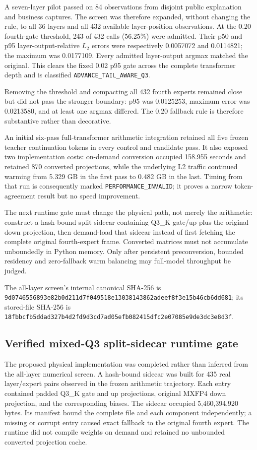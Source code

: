 A seven-layer pilot passed on 84 observations from disjoint public explanation
and business captures.  The screen was therefore expanded, without changing
the rule, to all 36 layers and all 432 available layer-position observations.
At the 0.20 fourth-gate threshold, 243 of 432 calls (56.25\%) were admitted.
Their p50 and p95 layer-output-relative $L_2$ errors were respectively
0.0057072 and 0.0114821; the maximum was 0.0177109.  Every admitted layer-output
argmax matched the original.  This clears the fixed 0.02 p95 gate across the
complete transformer depth and is classified
\texttt{ADVANCE\_TAIL\_AWARE\_Q3}.

Removing the threshold and compacting all 432 fourth experts remained close
but did not pass the stronger boundary: p95 was 0.0125253, maximum error was
0.0213580, and at least one argmax differed.  The 0.20 fallback rule is
therefore substantive rather than decorative.

An initial six-pass full-transformer arithmetic integration retained all five
frozen teacher continuation tokens in every control and candidate pass.  It
also exposed two implementation costs: on-demand conversion occupied
158.955 seconds and retained 870 converted projections, while the underlying
L2 traffic continued warming from 5.329 GB in the first pass to 0.482 GB in
the last.  Timing from that run is consequently marked
\texttt{PERFORMANCE\_INVALID}; it proves a narrow token-agreement result but no
speed improvement.

The next runtime gate must change the physical path, not merely the arithmetic:
construct a hash-bound split sidecar containing Q3\_K gate/up plus the original
down projection, then demand-load that sidecar instead of first fetching the
complete original fourth-expert frame.  Converted matrices must not accumulate
unboundedly in Python memory.  Only after persistent preconversion, bounded
residency and zero-fallback warm balancing may full-model throughput be judged.

The all-layer screen's internal canonical SHA-256 is
\texttt{9d0746556893e82b0d211d7f049518e13038143862adeef8f3e15b46cb6dd681};
its stored-file SHA-256 is
\texttt{18fbbcfb5ddad327b4d2fd9d3cd7ad05efb082415dfc2e07085e9de3dc3e8d3f}.

\subsection{Verified mixed-Q3 split-sidecar runtime gate}

The proposed physical implementation was completed rather than inferred from
the all-layer numerical screen.  A hash-bound sidecar was built for 435 real
layer/expert pairs observed in the frozen arithmetic trajectory.  Each entry
contained padded Q3\_K gate and up projections, original MXFP4 down projection,
and the corresponding biases.  The sidecar occupied 5,460,394,920 bytes.  Its
manifest bound the complete file and each component independently; a missing
or corrupt entry caused exact fallback to the original fourth expert.  The
runtime did not compile weights on demand and retained no unbounded converted
projection cache.

